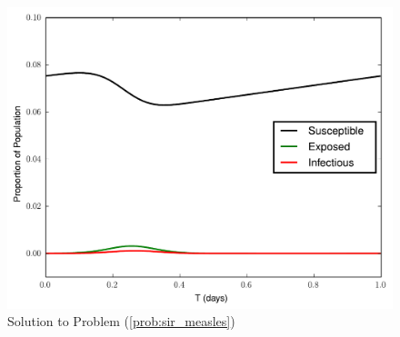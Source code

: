 \begin{figure}[ht]
\centering
\includegraphics[width=\textwidth]{measles.pdf}
\caption{Solution to Problem (\ref{prob:sir_measles})}
\label{fig:sir4}
\end{figure}

